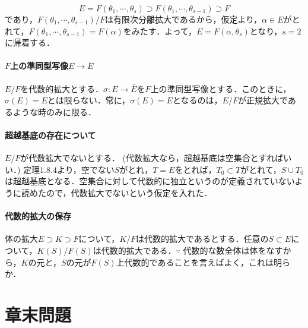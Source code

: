 \documentclass[a4paper,10pt]{ltjsarticle}
\begin{document}
\[ E = F(\theta_1, \cdots, \theta_s) \supset F(\theta_1, \cdots, \theta_{s - 1}) \supset F \]
であり，$F(\theta_1, \cdots, \theta_{s - 1})/F$は有限次分離拡大であるから，仮定より，$\alpha \in E$がとれて，$F(\theta_1, \cdots, \theta_{s - 1}) = F(\alpha)$をみたす．よって，$E = F(\alpha, \theta_s)$となり，$s = 2$に帰着する．

\paragraph*{$F$上の準同型写像$E \to \bar{E}$} $E/F$を代数的拡大とする．$\sigma: E \to \bar{E}$を$F$上の準同型写像とする．このときに，$\sigma(E) = E$とは限らない．常に，$\sigma(E) = E$となるのは，$E/F$が正規拡大であるような時のみに限る．

\paragraph*{超越基底の存在について} $E/F$が代数拡大でないとする． (代数拡大なら，超越基底は空集合とすればいい．) 定理$1.8.4$より，空でない$S$がとれ，$T = E$をとれば，$T_0 \subset T$がとれて，$S \cup T_0$は超越基底となる．空集合に対して代数的に独立というのが定義されていないように読めたので，代数拡大でないという仮定を入れた．

\paragraph*{代数的拡大の保存} 体の拡大$E \supset K \supset F$について，$K/F$は代数的拡大であるとする．任意の$S \subset E$について，$K(S)/F(S)$は代数的拡大である．$\because$ 代数的な数全体は体をなすから，$K$の元と，$S$の元が$F(S)$上代数的であることを言えばよく，これは明らか．

\section*{章末問題}
\end{document}
